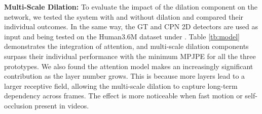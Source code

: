 \documentclass[twocolumn]{svjour3}          \smartqed  \usepackage{graphicx}
\begin{document}
{\bf Multi-Scale Dilation: } To evaluate the impact of the dilation component on the network,  we tested the system with and without dilation and compared their individual outcomes. In the same way, the GT and CPN  2D detectors are used as input and being tested on the Human3.6M dataset under . Table \ref{tb:model} demonstrates the integration of attention, and multi-scale dilation components surpass their individual performance with the minimum MPJPE for all the three prototypes. We also found the attention model makes an increasingly significant contribution as the layer number grows. This is because more layers lead to a larger receptive field, allowing the multi-scale dilation to capture long-term dependency across frames. The effect is more noticeable when fast motion or self-occlusion present in videos. 

\begin{table}[ht]
    \begin{center}
    \end{center}
    \caption{Ablation study on different components in our method. The evaluation is performed on Human3.6M under  with MPJPE (mm).}
    \label{tb:model}
\end{table}
\end{document}
